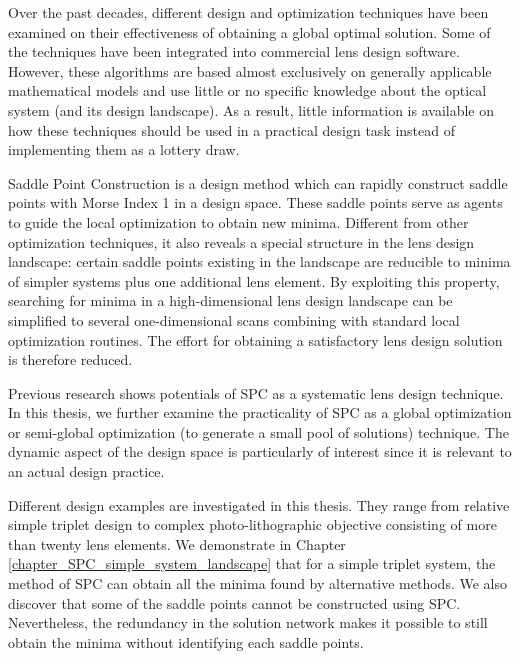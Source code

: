 Over the past decades, different design and optimization techniques have been examined on their effectiveness of obtaining a global optimal solution. Some of the techniques have been integrated into commercial lens design software. However, these algorithms are based almost exclusively on generally applicable mathematical models and use little or no specific knowledge about the optical system (and its design landscape). As a result, little information is available on how these techniques should be used in a practical design task instead of implementing them as a lottery draw. 

Saddle Point Construction is a design method which can rapidly construct saddle points with Morse Index 1 in a design space. These saddle points serve as agents to guide the local optimization to obtain new minima. Different from other optimization techniques, it also reveals a special structure in the lens design landscape: certain saddle points existing in the landscape are reducible to minima of simpler systems plus one additional lens element. By exploiting this property, searching for minima in a high-dimensional lens design landscape can be simplified to several one-dimensional scans combining with standard local optimization routines. The effort for obtaining a satisfactory lens design solution is therefore reduced.   

Previous research shows potentials of SPC as a systematic lens design technique. In this thesis, we further examine the practicality of SPC as a global optimization or semi-global optimization (to generate a small pool of solutions) technique. The dynamic aspect of the design space is particularly of interest since it is relevant to an actual design practice. 

Different design examples are investigated in this thesis. They range from relative simple triplet design to complex photo-lithographic objective consisting of more than twenty lens elements. We demonstrate in Chapter \ref{chapter_SPC_simple_system_landscape} that for a simple triplet system, the method of SPC can obtain all the minima found by alternative methods. We also discover that some of the saddle points cannot be constructed using SPC. Nevertheless, the redundancy in the solution network makes it possible to still obtain the minima without identifying each saddle points. 

